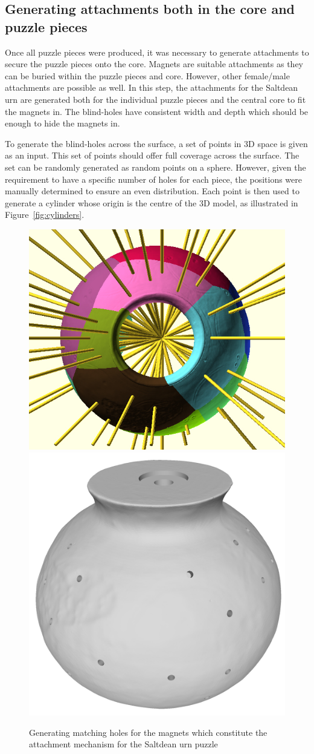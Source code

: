 \documentclass[acmlarge,screen,dvipsnames]{acmart}
\begin{document}
\subsection{Generating attachments both in the core and puzzle pieces}

Once all puzzle pieces were produced, it was necessary to generate
attachments to secure the puzzle pieces onto the core. Magnets are
suitable attachments as they can be buried within the puzzle pieces
and core. However, other female/male attachments are possible as
well. In this step, the attachments for the Saltdean urn are generated
both for the individual puzzle pieces and the central core to fit the
magnets in. The blind-holes have consistent width and depth which
should be enough to hide the magnets in.

To generate the blind-holes across the surface, a set of points in 3D
space is given as an input. This set of points should offer full
coverage across the surface. The set can be randomly generated as
random points on a sphere. However, given the requirement to have a
specific number of holes for each piece, the positions were manually
determined to ensure an even distribution. Each point is then used to
generate a cylinder whose origin is the centre of the 3D model, as
illustrated in Figure~\ref{fig:cylinders}.
%
\begin{figure}[htb]
  \centering
  {\includegraphics[width=0.45\linewidth]{images/allcylinders.jpg}}
  {\includegraphics[width=0.45\linewidth]{images/coreholes}}
 \caption{Generating matching holes for the magnets which constitute the attachment mechanism for the Saltdean urn puzzle}
\end{figure}
\end{document}

